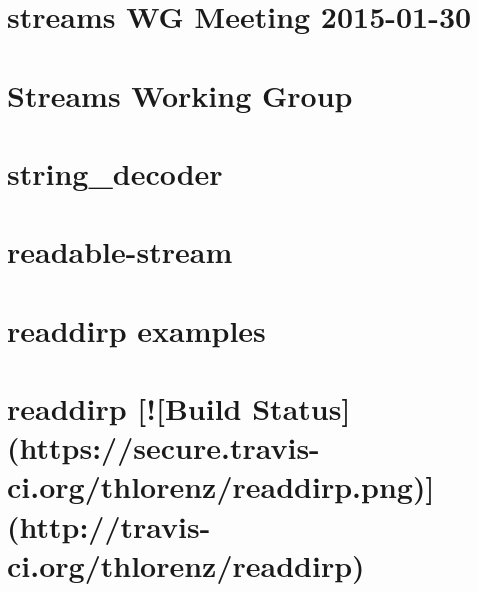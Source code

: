 \documentclass[twoside]{book}
\newcommand{\+}{\discretionary{\mbox{\scriptsize$\hookleftarrow$}}{}{}}
\begin{document}
\chapter{streams WG Meeting 2015-\/01-\/30}
\label{md__c_1_workspace_demo_src_main_script_node_modules_readable-stream_doc_wg-meetings_2015-01-30}

\chapter{Streams Working Group}
\label{md__c_1_workspace_demo_src_main_script_node_modules_readable-stream__g_o_v_e_r_n_a_n_c_e}

\chapter{string\+\_\+decoder}
\label{md__c_1_workspace_demo_src_main_script_node_modules_readable-stream_node_modules_string_decoder__r_e_a_d_m_e}

\chapter{readable-\/stream}
\label{md__c_1_workspace_demo_src_main_script_node_modules_readable-stream__r_e_a_d_m_e}

\chapter{readdirp examples}
\label{md__c_1_workspace_demo_src_main_script_node_modules_readdirp_examples__readme}

\chapter{readdirp \mbox{[}!\mbox{[}Build Status\mbox{]}(https\+://secure.travis-\/ci.org/thlorenz/readdirp.png)\mbox{]}(http\+://travis-\/ci.org/thlorenz/readdirp)}
\label{md__c_1_workspace_demo_src_main_script_node_modules_readdirp__r_e_a_d_m_e}

\end{document}
